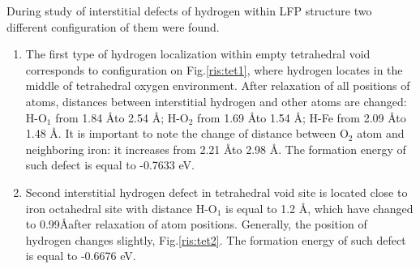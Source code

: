 During study of interstitial defects of hydrogen within LFP structure two different configuration of them were found. 
\begin{enumerate}
	\item The first type of hydrogen localization within empty tetrahedral void corresponds to configuration on Fig.\ref{ris:tet1}, where hydrogen locates in the middle of tetrahedral oxygen environment. After relaxation of all positions of atoms, distances between interstitial hydrogen and other atoms are changed: H-O$_1$ from 1.84 \AA to 2.54 \AA; H-O$_2$ from 1.69 \AA to 1.54 \AA; H-Fe from 2.09 \AA to 1.48 \AA. It is important to note the change of distance between O$_2$ atom and neighboring iron: it increases from 2.21 \AA to 2.98 \AA. The formation energy of such defect is equal to -0.7633 eV.
	\item Second interstitial hydrogen defect in tetrahedral void site is located close to iron octahedral site with distance H-O$_1$ is equal to 1.2 \AA, which have changed to 0.99\AA after relaxation of atom positions. Generally, the position of hydrogen changes slightly, Fig.\ref{ris:tet2}. The formation energy of such defect is equal to -0.6676 eV.	
\end{enumerate}


